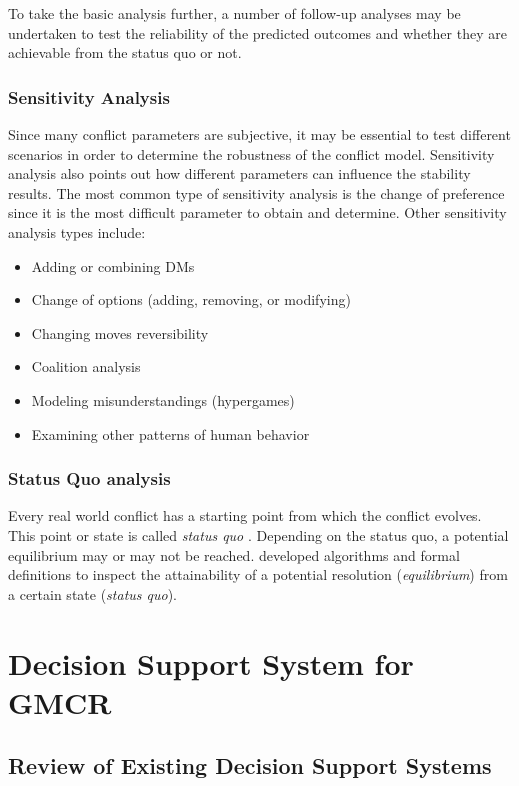 \documentclass[letterpaper,12pt,titlepage,oneside,final]{book}
\begin{document}
To take the basic analysis further, a number of follow-up analyses may be undertaken to test the reliability of the predicted outcomes and whether they are achievable from the status quo or not.

\subsubsection{Sensitivity Analysis}

Since many conflict parameters are subjective, it may be essential to test different scenarios in order to determine the robustness of the conflict model. Sensitivity analysis also points out how different parameters can influence the stability results. The most common type of sensitivity analysis is the change of preference since it is the most difficult parameter to obtain and determine. Other sensitivity analysis types include:

\begin{itemize}
\item Adding or combining DMs
\item Change of options (adding, removing, or modifying) 
\item Changing moves reversibility
\item Coalition analysis
\item Modeling misunderstandings (hypergames)
\item Examining other patterns of human behavior
\end{itemize}


\subsubsection{Status Quo analysis}

Every real world conflict has a starting point from which the conflict evolves. This point or state is called \emph{status quo} \citep{fang1993}. Depending on the status quo, a potential equilibrium may or may not be reached. \citet{li2004squo,li2005squo} developed algorithms and formal definitions to inspect the attainability of a potential resolution (\emph{equilibrium}) from a certain state (\emph{status quo}).

\section{Decision Support System for GMCR}

\subsection{Review of Existing Decision Support Systems}
\end{document}
